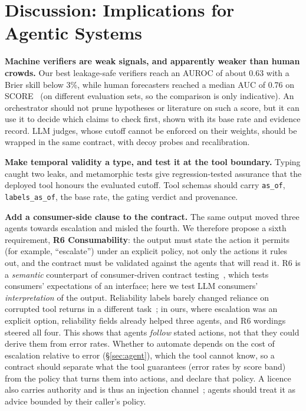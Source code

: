 \documentclass[conference]{IEEEtran}
\begin{document}
\section{Discussion: Implications for Agentic Systems}\label{sec:discussion}
\textbf{Machine verifiers are weak signals, and apparently weaker than human crowds.} Our best leakage-safe verifiers reach an AUROC of about 0.63 with a Brier skill below 3\%, while human forecasters reached a median AUC of 0.76 on SCORE~\cite{mody2026} (on different evaluation sets, so the comparison is only indicative). An orchestrator should not prune hypotheses or literature on such a score, but it can use it to decide which claims to check first, shown with its base rate and evidence record. LLM judges, whose cutoff cannot be enforced on their weights, should be wrapped in the same contract, with decoy probes and recalibration.

\textbf{Make temporal validity a type, and test it at the tool boundary.} Typing caught two leaks, and metamorphic tests give regression-tested assurance that the deployed tool honours the evaluated cutoff. Tool schemas should carry \texttt{as\_of}, \texttt{labels\_as\_of}, the base rate, the gating verdict and provenance.

\textbf{Add a consumer-side clause to the contract.} The same output moved three agents towards escalation and misled the fourth. We therefore propose a sixth requirement, \textbf{R6 Consumability}: the output must state the action it permits (for example, ``escalate'') under an explicit policy, not only the actions it rules out, and the contract must be validated against the agents that will read it. R6 is a \emph{semantic} counterpart of consumer-driven contract testing~\cite{robinson2006}, which tests consumers' expectations of an interface; here we test LLM consumers' \emph{interpretation} of the output. Reliability labels barely changed reliance on corrupted tool returns in a different task~\cite{yang2026overreliance}; in ours, where escalation was an explicit option, reliability fields already helped three agents, and R6 wordings steered all four. This shows that agents \emph{follow} stated actions, not that they could derive them from error rates. Whether to automate depends on the cost of escalation relative to error (\S\ref{sec:agent}), which the tool cannot know, so a contract should separate what the tool guarantees (error rates by score band) from the policy that turns them into actions, and declare that policy. A licence also carries authority and is thus an injection channel~\cite{yergattikar2026securing}; agents should treat it as advice bounded by their caller's policy.
\end{document}
